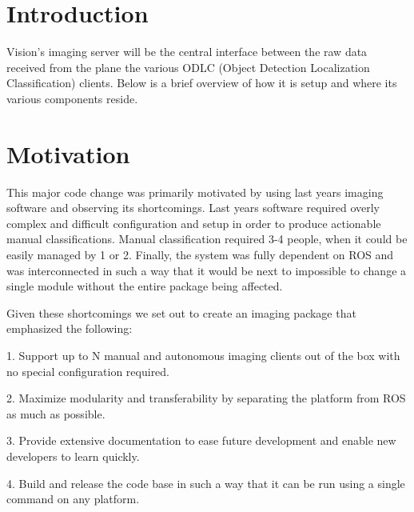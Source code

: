 \documentclass[]{auvsi_doc}
\begin{document}
\begin{AUVSITitlePage}
\begin{artifacttable}
\end{artifacttable}
\end{AUVSITitlePage}

\section{Introduction}

Vision's imaging server will be the central interface between the raw data received from the plane 
the various ODLC (Object Detection Localization Classification) clients. Below is a brief overview of how it is setup and where its various components reside.

\section{Motivation}

This major code change was primarily motivated by using last years imaging
software and observing its shortcomings. Last years software required overly 
complex and difficult configuration and setup in order to produce actionable 
manual classifications. Manual classification  required 3-4 people, when it 
could be easily managed by 1 or 2. Finally, the system was fully dependent 
on ROS and was interconnected in such a way that it would be next to impossible to change
a single module without the entire package being affected.

Given these shortcomings we set out to create an imaging package that emphasized
the following:

1. Support up to N manual and autonomous imaging clients out of the box with no 
special configuration required.

2. Maximize modularity and transferability by separating the platform from ROS as 
much as possible.

3. Provide extensive documentation to ease future development and enable new developers
to learn quickly.

4. Build and release the code base in such a way that it can be run using a single command
on any platform.
\end{document}

